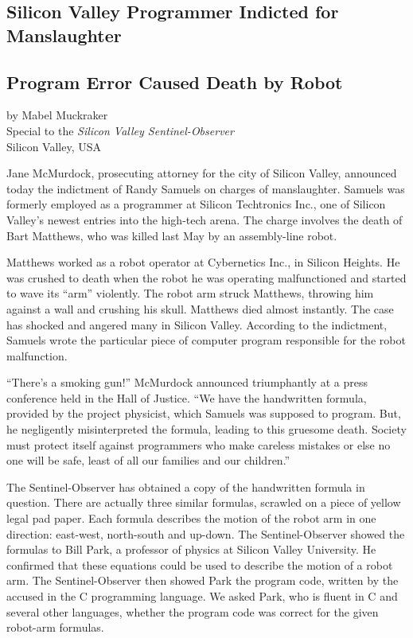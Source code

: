 \begin{center}
\section*{Silicon Valley Programmer Indicted for Manslaughter}
\subsection*{Program Error Caused Death by Robot}
by Mabel Muckraker\\
Special to the \textit{Silicon Valley Sentinel-Observer}\\
Silicon Valley, USA
\end{center}

Jane McMurdock, prosecuting attorney for the city of Silicon Valley, announced
today the indictment of Randy Samuels on charges of manslaughter. Samuels was
formerly employed as a programmer at Silicon Techtronics Inc., one of Silicon
Valley's newest entries into the high-tech arena. The charge involves the death
of Bart Matthews, who was killed last May by an assembly-line robot.

Matthews worked as a robot operator at Cybernetics Inc., in Silicon Heights. He
was crushed to death when the robot he was operating malfunctioned and started
to wave its ``arm'' violently. The robot arm struck Matthews, throwing him
against a wall and crushing his skull. Matthews died almost instantly. The case
has shocked and angered many in Silicon Valley. According to the indictment,
Samuels wrote the particular piece of computer program responsible for the
robot malfunction.

``There's a smoking gun!'' McMurdock announced triumphantly at a press conference
held in the Hall of Justice. ``We have the handwritten formula, provided by the
project physicist, which Samuels was supposed to program. But, he negligently
misinterpreted the formula, leading to this gruesome death. Society must
protect itself against programmers who make careless mistakes or else no one
will be safe, least of all our families and our children.''

The Sentinel-Observer has obtained a copy of the handwritten formula in
question. There are actually three similar formulas, scrawled on a piece of
yellow legal pad paper. Each formula describes the motion of the robot arm in
one direction: east-west, north-south and up-down. The Sentinel-Observer showed
the formulas to Bill Park, a professor of physics at Silicon Valley University.
He confirmed that these equations could be used to describe the motion of a
robot arm. The Sentinel-Observer then showed Park the program code, written by
the accused in the C programming language. We asked Park, who is fluent in C
and several other languages, whether the program code was correct for the given
robot-arm formulas.

